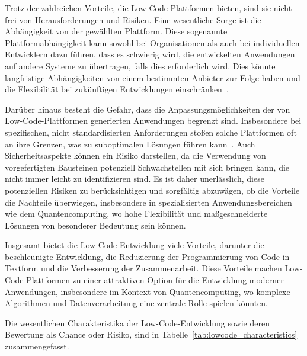 Trotz der zahlreichen Vorteile, die Low-Code-Plattformen bieten, sind sie nicht frei von Herausforderungen und Risiken. 
Eine wesentliche Sorge ist die Abhängigkeit von der gewählten Plattform. Diese sogenannte Plattformabhängigkeit kann 
sowohl bei Organisationen als auch bei individuellen Entwicklern dazu führen, dass es schwierig wird, die entwickelten 
Anwendungen auf andere Systeme zu übertragen, falls dies erforderlich wird. Dies könnte langfristige Abhängigkeiten 
von einem bestimmten Anbieter zur Folge haben und die Flexibilität bei zukünftigen Entwicklungen einschränken~\cite{Alamin_2021}. 

Darüber hinaus besteht die Gefahr, dass die Anpassungsmöglichkeiten der von Low-Code-Plattformen generierten 
Anwendungen begrenzt sind. Insbesondere bei spezifischen, nicht standardisierten Anforderungen stoßen solche 
Plattformen oft an ihre Grenzen, was zu suboptimalen Lösungen führen kann~\cite{Alamin_2021}. Auch Sicherheitsaspekte 
können ein Risiko darstellen, da die Verwendung von vorgefertigten Bausteinen potenziell Schwachstellen mit sich 
bringen kann, die nicht immer leicht zu identifizieren sind. Es ist daher unerlässlich, diese potenziellen Risiken 
zu berücksichtigen und sorgfältig abzuwägen, ob die Vorteile die Nachteile überwiegen, insbesondere in spezialisierten 
Anwendungsbereichen wie dem Quantencomputing, wo hohe Flexibilität und maßgeschneiderte Lösungen von besonderer 
Bedeutung sein können.

Insgesamt bietet die Low-Code-Entwicklung viele Vorteile, darunter die beschleunigte Entwicklung, die Reduzierung 
der Programmierung von Code in Textform und die Verbesserung der Zusammenarbeit. Diese Vorteile machen Low-Code-Plattformen zu einer 
attraktiven Option für die Entwicklung moderner Anwendungen, insbesondere im Kontext von Quantencomputing, wo 
komplexe Algorithmen und Datenverarbeitung eine zentrale Rolle spielen könnten.

Die wesentlichen Charakteristika der Low-Code-Entwicklung sowie deren Bewertung als Chance oder Risiko, sind in 
Tabelle~\ref{tab:lowcode_characteristics} zusammengefasst.


